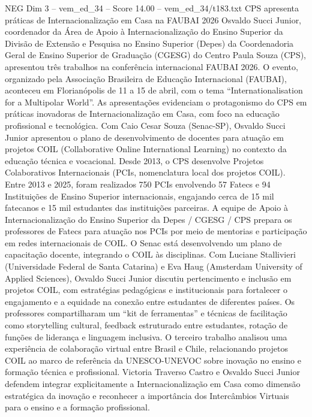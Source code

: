 \begin{textsample}{NEG Dim 3 – vem\_ed\_34 – Score 14.00 – vem\_ed\_34/t183.txt}  \label{ex:f3_neg_126}
CPS apresenta práticas de Internacionalização em Casa na FAUBAI 2026 Osvaldo Succi Junior, coordenador da Área de Apoio à Internacionalização do Ensino Superior da Divisão de Extensão e Pesquisa no Ensino Superior (Depes) da Coordenadoria Geral de Ensino Superior de Graduação (CGESG) do Centro Paula Souza (CPS), apresentou três trabalhos na conferência internacional FAUBAI 2026.
O evento, organizado pela Associação Brasileira de Educação Internacional (FAUBAI), aconteceu em Florianópolis de 11 a 15 de abril, com o tema “Internationalisation for a Multipolar World”.
As apresentações evidenciam o protagonismo do CPS em práticas inovadoras de Internacionalização em Casa, com foco na educação profissional e tecnológica.
Com Caio Cesar Souza (Senac-SP), Osvaldo Succi Junior apresentou o plano de desenvolvimento de docentes para atuação em projetos COIL (Collaborative Online International Learning) no contexto da educação técnica e vocacional.
Desde 2013, o CPS desenvolve Projetos Colaborativos Internacionais (PCIs, nomenclatura local dos projetos COIL).
Entre 2013 e 2025, foram realizados 750 PCIs envolvendo 57 Fatecs e 94 Instituições de Ensino Superior internacionais, engajando cerca de 15 mil fatecanos e 15 mil estudantes das instituições parceiras.
A equipe de Apoio à Internacionalização do Ensino Superior da Depes / CGESG / CPS prepara os professores de Fatecs para atuação nos PCIs por meio de mentorias e participação em redes internacionais de COIL.
O Senac está desenvolvendo um plano de capacitação docente, integrando o COIL às disciplinas.
Com Luciane Stallivieri (Universidade Federal de Santa Catarina) e Eva Haug (Amsterdam University of Applied Sciences), Osvaldo Succi Junior discutiu pertencimento e inclusão em projetos COIL, com estratégias pedagógicas e institucionais para fortalecer o engajamento e a equidade na conexão entre estudantes de diferentes países.
Os professores compartilharam um “kit de ferramentas” e técnicas de facilitação como storytelling cultural, feedback estruturado entre estudantes, rotação de funções de liderança e linguagem inclusiva.
O terceiro trabalho analisou uma experiência de colaboração virtual entre Brasil e Chile, relacionando projetos COIL ao marco de referência da UNESCO-UNEVOC sobre inovação no ensino e formação técnica e profissional.
Victoria Traverso Castro e Osvaldo Succi Junior defendem integrar explicitamente a Internacionalização em Casa como dimensão estratégica da inovação e reconhecer a importância dos Intercâmbios Virtuais para o ensino e a formação profissional.

\end{textsample}
